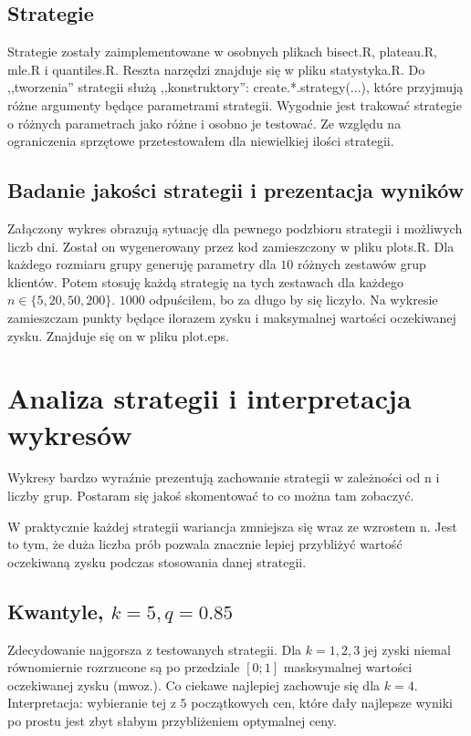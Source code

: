 \documentclass[a4paper,11pt]{article}
\begin{document}
\subsection{Strategie}
Strategie zostały zaimplementowane w osobnych plikach bisect.R, plateau.R, mle.R i quantiles.R.
Reszta narzędzi znajduje się w pliku statystyka.R. Do ,,tworzenia'' strategii
służą ,,konstruktory'': create.*.strategy(...), które przyjmują różne argumenty
będące parametrami strategii. Wygodnie jest trakować strategie o różnych parametrach
jako różne i osobno je testować. Ze względu na ograniczenia sprzętowe przetestowałem
dla niewielkiej ilości strategii.

\subsection{Badanie jakości strategii i prezentacja wyników}
Załączony wykres obrazują sytuację dla pewnego podzbioru strategii i możliwych liczb dni.
Został on wygenerowany przez kod zamieszczony w pliku plots.R. Dla każdego
rozmiaru grupy generuję parametry dla $10$ różnych zestawów grup klientów. Potem stosuję
każdą strategię na tych zestawach dla każdego $n \in \{5, 20, 50, 200\}$. $1000$ odpuściłem,
bo za długo by się liczyło. Na wykresie zamieszczam punkty będące ilorazem zysku i 
maksymalnej wartości oczekiwanej zysku. Znajduje się on w pliku plot.eps.

\section{Analiza strategii i interpretacja wykresów}
Wykresy bardzo wyraźnie prezentują zachowanie strategii w zależności od n i liczby grup.
Postaram się jakoś skomentować to co można tam zobaczyć.

W praktycznie każdej strategii wariancja zmniejsza się wraz ze wzrostem n. Jest to tym,
że duża liczba prób pozwala znacznie lepiej przybliżyć wartość oczekiwaną zysku podczas
stosowania danej strategii.

\subsection{Kwantyle, $k=5, q=0.85$}
Zdecydowanie najgorsza z testowanych strategii. Dla $k = 1, 2, 3$ jej zyski niemal równomiernie
rozrzucone są po przedziale $[0; 1]$ masksymalnej wartości oczekiwanej zysku (mwoz.).
Co ciekawe najlepiej zachowuje się dla $k = 4$. Interpretacja: wybieranie tej
z $5$ początkowych cen, które dały najlepsze wyniki po prostu jest zbyt słabym
przybliżeniem optymalnej ceny.
\end{document}
